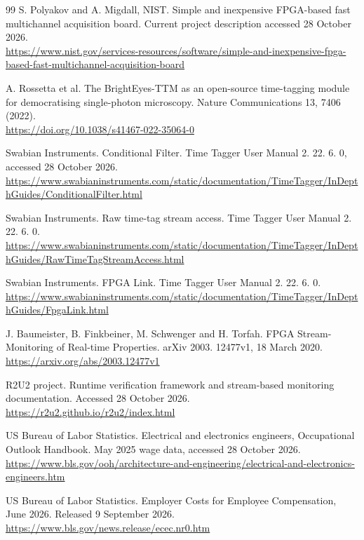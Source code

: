 \begin{thebibliography}{99}
 S. Polyakov and A. Migdall, NIST. Simple and inexpensive FPGA-based fast multichannel acquisition board. Current project description accessed 28 October 2026.\\\url{https://www.nist.gov/services-resources/software/simple-and-inexpensive-fpga-based-fast-multichannel-acquisition-board}

 A. Rossetta et al. The BrightEyes-TTM as an open-source time-tagging module for democratising single-photon microscopy. Nature Communications 13, 7406 (2022).\\\url{https://doi.org/10.1038/s41467-022-35064-0}

 Swabian Instruments. Conditional Filter. Time Tagger User Manual 2. 22. 6. 0, accessed 28 October 2026.\\\url{https://www.swabianinstruments.com/static/documentation/TimeTagger/InDepthGuides/ConditionalFilter.html}

 Swabian Instruments. Raw time-tag stream access. Time Tagger User Manual 2. 22. 6. 0.\\\url{https://www.swabianinstruments.com/static/documentation/TimeTagger/InDepthGuides/RawTimeTagStreamAccess.html}

 Swabian Instruments. FPGA Link. Time Tagger User Manual 2. 22. 6. 0.\\\url{https://www.swabianinstruments.com/static/documentation/TimeTagger/InDepthGuides/FpgaLink.html}

 J. Baumeister, B. Finkbeiner, M. Schwenger and H. Torfah. FPGA Stream-Monitoring of Real-time Properties. arXiv 2003. 12477v1, 18 March 2020.\\\url{https://arxiv.org/abs/2003.12477v1}

 R2U2 project. Runtime verification framework and stream-based monitoring documentation. Accessed 28 October 2026.\\\url{https://r2u2.github.io/r2u2/index.html}

 US Bureau of Labor Statistics. Electrical and electronics engineers, Occupational Outlook Handbook. May 2025 wage data, accessed 28 October 2026.\\\url{https://www.bls.gov/ooh/architecture-and-engineering/electrical-and-electronics-engineers.htm}

 US Bureau of Labor Statistics. Employer Costs for Employee Compensation, June 2026. Released 9 September 2026.\\\url{https://www.bls.gov/news.release/ecec.nr0.htm}


\end{thebibliography}
